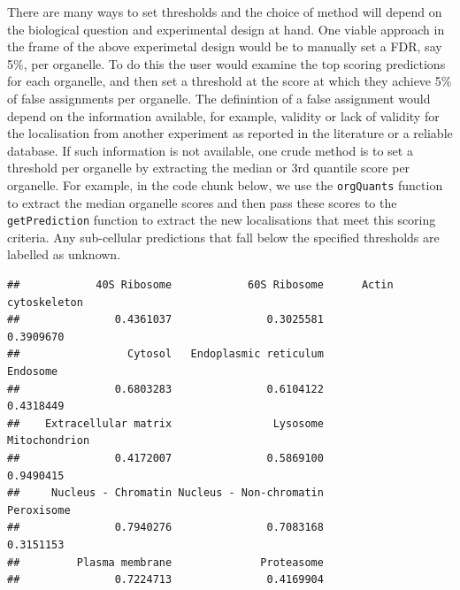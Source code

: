 There are many ways to set thresholds and the choice of method will
depend on the biological question and experimental design at hand. One
viable approach in the frame of the above experimetal design would be to
manually set a FDR, say 5\%, per organelle. To do this the user would
examine the top scoring predictions for each organelle, and then set a
threshold at the score at which they achieve 5\% of false assignments
per organelle. The definintion of a false assignment would depend on the
information available, for example, validity or lack of validity for the
localisation from another experiment as reported in the literature or a
reliable database. If such information is not available, one crude
method is to set a threshold per organelle by extracting the median or
3rd quantile score per organelle. For example, in the code chunk below,
we use the \texttt{orgQuants} function to extract the median organelle
scores and then pass these scores to the \texttt{getPrediction} function
to extract the new localisations that meet this scoring criteria. Any
sub-cellular predictions that fall below the specified thresholds are
labelled as unknown.

\begin{Shaded}
\begin{Highlighting}[]
\StringTok{ }
                 \NormalTok{, }
                 \NormalTok{,}
                 \NormalTok{, }
                 \NormalTok{)}
\end{Highlighting}
\end{Shaded}

\begin{verbatim}
##            40S Ribosome            60S Ribosome      Actin cytoskeleton 
##               0.4361037               0.3025581               0.3909670 
##                 Cytosol   Endoplasmic reticulum                Endosome 
##               0.6803283               0.6104122               0.4318449 
##    Extracellular matrix                Lysosome           Mitochondrion 
##               0.4172007               0.5869100               0.9490415 
##     Nucleus - Chromatin Nucleus - Non-chromatin              Peroxisome 
##               0.7940276               0.7083168               0.3151153 
##         Plasma membrane              Proteasome 
##               0.7224713               0.4169904
\end{verbatim}

